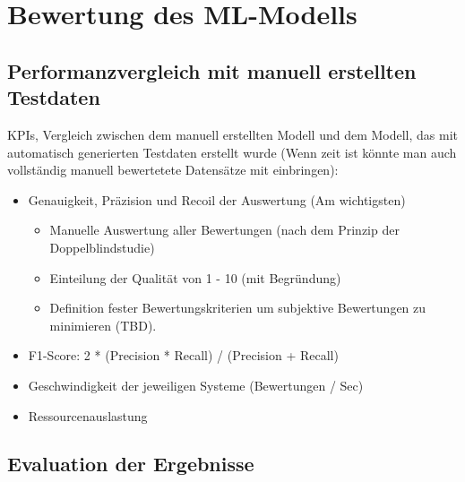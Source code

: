 \section{Bewertung des ML-Modells}

\subsection{Performanzvergleich mit manuell erstellten Testdaten}

KPIs, Vergleich zwischen dem manuell erstellten Modell und dem Modell, das mit automatisch generierten Testdaten erstellt wurde (Wenn zeit ist könnte man auch vollständig manuell bewertetete Datensätze mit einbringen):
\begin{itemize}
  \item Genauigkeit, Präzision und Recoil der Auswertung (Am wichtigsten)
  \begin{itemize}
    \item Manuelle Auswertung aller Bewertungen (nach dem Prinzip der Doppelblindstudie)
    \item Einteilung der Qualität von 1 - 10 (mit Begründung)
    \item Definition fester Bewertungskriterien um subjektive Bewertungen zu minimieren (TBD).
  \end{itemize}
  \item F1-Score: 2 * (Precision * Recall) / (Precision + Recall)
  \item Geschwindigkeit der jeweiligen Systeme (Bewertungen / Sec)
  \item Ressourcenauslastung
\end{itemize}


\subsection{Evaluation der Ergebnisse}
